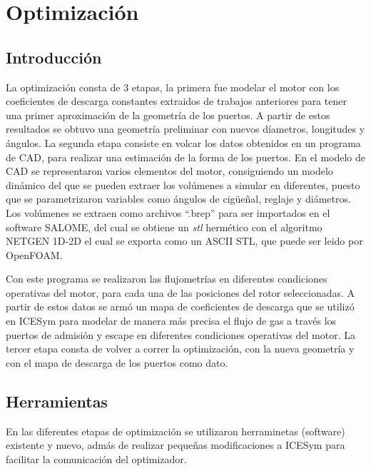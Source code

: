 \chapter{Optimización}

\section{Introducción}
La optimización consta de 3 etapas, la primera fue modelar el motor con
los coeficientes de descarga constantes extraidos de trabajos anteriores
para tener una primer aproximación de la geometría de los puertos.
%
A partir de estos resultados se obtuvo una geometría preliminar
con nuevos díametros, longitudes y ángulos.
%
La segunda etapa consiste en volcar los datos obtenidos en un programa de CAD,
para realizar una estimación de la forma de los puertos.
%
En el modelo de CAD se representaron varios elementos del motor, consiguiendo un
modelo dinámico del que se pueden extraer los volúmenes a simular en diferentes,
puesto que se parametrizaron variables como ángulos de cigüeñal, reglaje y
diámetros.
%
Los volúmenes se extraen como archivos ``.brep'' para ser importados en el
software SALOME, del cual se obtiene un \emph{stl} hermético con el algoritmo
NETGEN 1D-2D el cual se exporta como un ASCII STL, que puede ser leido por
OpenFOAM.

Con este programa se realizaron las flujometrías en diferentes condiciones
operativas del motor, para cada una de las posiciones del rotor seleccionadas.
%
A partir de estos datos se armó un mapa de coeficientes de descarga que se
utilizó en ICESym para modelar de manera más precisa el flujo de gas a través
los puertos de admisión y escape en diferentes condiciones operativas del motor.
%
La tercer etapa consta de volver a correr la optimización, con la nueva
geometría y con el mapa de descarga de los puertos como dato.

\section{Herramientas}
En las diferentes etapas de optimización se utilizaron herraminetas (software)
existente y nuevo, admás de realizar pequeñas modificaciones a ICESym para
facilitar la comunicación del optimizador.

